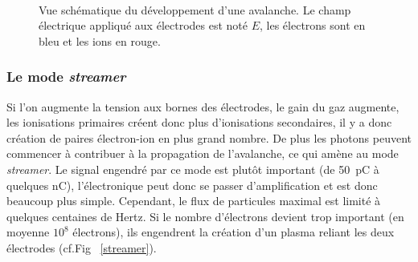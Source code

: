 \begin{figure}[ht!]
\centering
{}
\hfill
{}
\\
\hfill
{}
\caption{Vue schématique du développement d'une avalanche. Le champ électrique appliqué aux électrodes est noté $E$, les électrons sont en bleu et les ions en rouge.}
\label{avalanche}
\end{figure}

\subsubsection{Le mode \textit{streamer}}

Si l'on augmente la tension aux bornes des électrodes, le gain du gaz augmente, les ionisations primaires créent donc plus d'ionisations secondaires, il y a donc création de paires électron-ion en plus grand nombre. De plus les photons peuvent commencer à contribuer à la propagation de l'avalanche, ce qui amène au mode \textit{streamer}. Le signal engendré par ce mode est plutôt important (de \SI{50}{\pico\coulomb} à quelques \si{\nano\coulomb}), l'électronique peut donc se passer d'amplification et est donc beaucoup plus simple. Cependant, le flux de particules maximal est limité à quelques centaines de Hertz. Si le nombre d'électrons devient trop important (en moyenne $10^{8}$ électrons), ils engendrent la création d'un plasma reliant les deux électrodes (cf.Fig~ \ref{streamer}).

